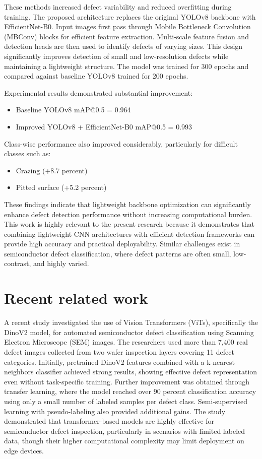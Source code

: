 These methods increased defect variability and reduced overfitting during training.
The proposed architecture replaces the original YOLOv8 backbone with EfficientNet-B0. Input images first pass through Mobile Bottleneck Convolution (MBConv) blocks for efficient feature extraction. Multi-scale feature fusion and detection heads are then used to identify defects of varying sizes. This design significantly improves detection of small and low-resolution defects while maintaining a lightweight structure.
The model was trained for 300 epochs and compared against baseline YOLOv8 trained for 200 epochs.

Experimental results demonstrated substantial improvement:
\begin{itemize}
 \item Baseline YOLOv8 mAP@0.5 = 0.964
 \item Improved YOLOv8 + EfficientNet-B0 mAP@0.5 = 0.993
\end{itemize}
Class-wise performance also improved considerably, particularly for difficult classes such as:
\begin{itemize}
 \item Crazing (+8.7 percent)
 \item Pitted surface (+5.2 percent)
\end{itemize}

These findings indicate that lightweight backbone optimization can significantly enhance defect detection performance without increasing computational burden.
This work is highly relevant to the present research because it demonstrates that combining lightweight CNN architectures with efficient detection frameworks can provide high accuracy and practical deployability. Similar challenges exist in semiconductor defect classification, where defect patterns are often small, low-contrast, and highly varied.

\section{Recent related work}
A recent study investigated the use of Vision Transformers (ViTs), specifically the DinoV2 model, for automated semiconductor defect classification using Scanning Electron Microscope (SEM) images. 
The researchers used more than 7,400 real defect images collected from two wafer inspection layers covering 11 defect categories. Initially, pretrained DinoV2 features combined with a k-nearest neighbors 
classifier achieved strong results, showing effective defect representation even without task-specific training. Further improvement was obtained through transfer learning, where the model reached over
 90 percent classification accuracy using only a small number of labeled samples per defect class. Semi-supervised learning with pseudo-labeling also provided additional gains. The study demonstrated that 
 transformer-based models are highly effective for semiconductor defect inspection, particularly in scenarios with limited labeled data, though their higher computational complexity may limit deployment 
 on edge devices.
